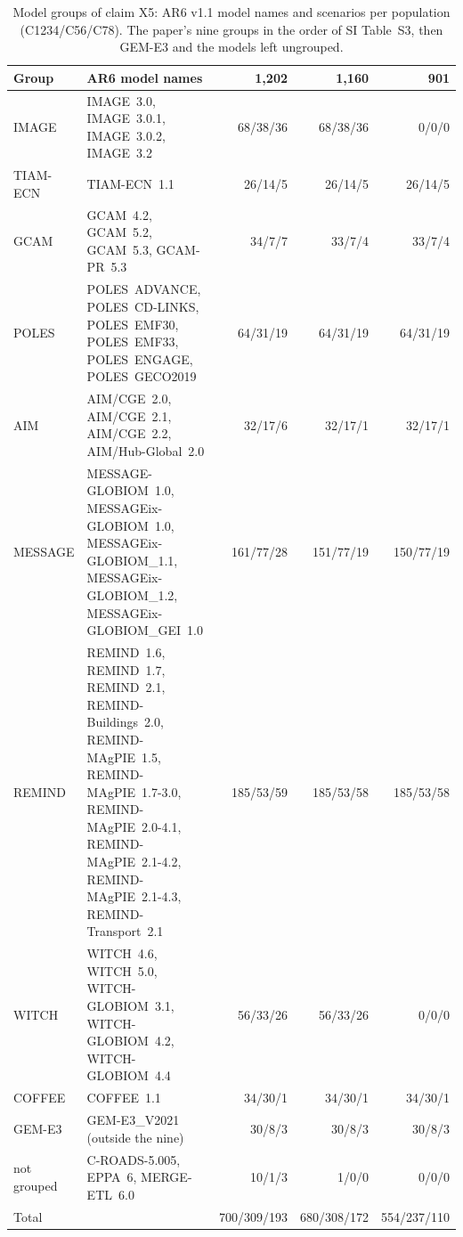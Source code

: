 \documentclass[11pt,a4paper]{article}
\newcommand{\prop}[1]{#1}
\newcommand{\propblock}{}
\newcommand{\prop}[1]{\textcolor{blue}{#1}}
\newcommand{\propblock}{\color{blue}}
\begin{document}
\begin{table}[H]
\caption{\prop{Model groups of claim X5: AR6 v1.1 model names and
scenarios per population (C1234/C56/C78). The paper's nine groups in the
order of SI Table~S3, then GEM-E3 and the models left ungrouped.}}
\label{tab:groups}
\footnotesize\propblock
\begin{tabularx}{\textwidth}{@{}l Y r r r@{}}
\toprule
Group & AR6 model names & 1{,}202 & 1{,}160 & 901\\
\midrule
IMAGE & \mbox{IMAGE 3.0}, \mbox{IMAGE 3.0.1}, \mbox{IMAGE 3.0.2}, \mbox{IMAGE 3.2} & 68/38/36 & 68/38/36 & 0/0/0\\
TIAM-ECN & \mbox{TIAM-ECN 1.1} & 26/14/5 & 26/14/5 & 26/14/5\\
GCAM & \mbox{GCAM 4.2}, \mbox{GCAM 5.2}, \mbox{GCAM 5.3}, \mbox{GCAM-PR 5.3} & 34/7/7 & 33/7/4 & 33/7/4\\
POLES & \mbox{POLES ADVANCE}, \mbox{POLES CD-LINKS}, \mbox{POLES EMF30}, \mbox{POLES EMF33}, \mbox{POLES ENGAGE}, \mbox{POLES GECO2019} & 64/31/19 & 64/31/19 & 64/31/19\\
AIM & \mbox{AIM/CGE 2.0}, \mbox{AIM/CGE 2.1}, \mbox{AIM/CGE 2.2}, \mbox{AIM/Hub-Global 2.0} & 32/17/6 & 32/17/1 & 32/17/1\\
MESSAGE & \mbox{MESSAGE-GLOBIOM 1.0}, \mbox{MESSAGEix-GLOBIOM 1.0}, \mbox{MESSAGEix-GLOBIOM\_1.1}, \mbox{MESSAGEix-GLOBIOM\_1.2}, \mbox{MESSAGEix-GLOBIOM\_GEI 1.0} & 161/77/28 & 151/77/19 & 150/77/19\\
REMIND & \mbox{REMIND 1.6}, \mbox{REMIND 1.7}, \mbox{REMIND 2.1}, \mbox{REMIND-Buildings 2.0}, \mbox{REMIND-MAgPIE 1.5}, \mbox{REMIND-MAgPIE 1.7-3.0}, \mbox{REMIND-MAgPIE 2.0-4.1}, \mbox{REMIND-MAgPIE 2.1-4.2}, \mbox{REMIND-MAgPIE 2.1-4.3}, \mbox{REMIND-Transport 2.1} &
  185/53/59 & 185/53/58 & 185/53/58\\
WITCH & \mbox{WITCH 4.6}, \mbox{WITCH 5.0}, \mbox{WITCH-GLOBIOM 3.1}, \mbox{WITCH-GLOBIOM 4.2}, \mbox{WITCH-GLOBIOM 4.4} & 56/33/26 & 56/33/26 & 0/0/0\\
COFFEE & \mbox{COFFEE 1.1} & 34/30/1 & 34/30/1 & 34/30/1\\
\midrule
GEM-E3 & \mbox{GEM-E3\_V2021} (outside the nine) & 30/8/3 & 30/8/3 & 30/8/3\\
not grouped & \mbox{C-ROADS-5.005}, \mbox{EPPA 6}, \mbox{MERGE-ETL 6.0} & 10/1/3 & 1/0/0 & 0/0/0\\
\midrule
Total & & 700/309/193 & 680/308/172 & 554/237/110\\
\bottomrule
\end{tabularx}
\end{table}
\end{document}
